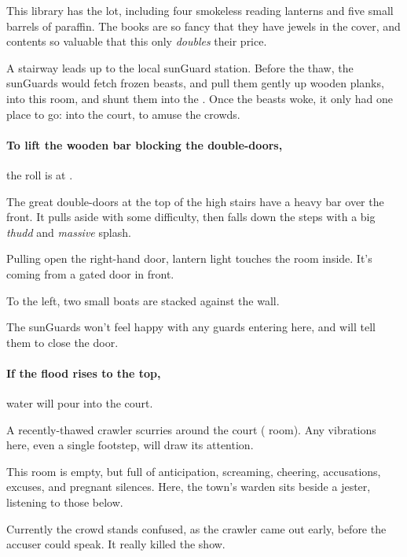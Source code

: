 \begin{multicols}{2}

This library has the lot, including four smokeless reading lanterns and five small barrels of paraffin.
The books are so fancy that they have jewels in the cover, and contents so valuable that this only \emph{doubles} their price.




\begin{exampletext}
  A stairway leads up to the local \gls{sunGuard} station.
  Before the thaw, the \glspl{sunGuard} would fetch frozen beasts, and pull them gently up wooden planks, into this room, and shunt them into the .
  Once the beasts woke, it only had one place to go: into the \gls{court}, to amuse the crowds.
\end{exampletext}

\paragraph{To lift the wooden bar blocking the double-doors,}
the roll is  at \tn[7].

\begin{boxtext}
  The great double-doors at the top of the high stairs have a heavy bar over the front.
  It pulls aside with some difficulty, then falls down the steps with a big \emph{thudd} and \emph{massive} splash.

  Pulling open the right-hand door, lantern light touches the room inside.
  It's coming from a gated door in front.

  To the left, two small boats are stacked against the wall.
\end{boxtext}

The \glspl{sunGuard} won't feel happy with any \glspl{guard} entering here, and will tell them to close the door.

\paragraph{If the flood rises to the top,}
water will pour into the \gls{court}.


A recently-thawed \gls{crawler} scurries around the \gls{court} ( room).
Any vibrations here, even a single footstep, will draw its attention.


\begin{exampletext}
  This room is empty, but full of anticipation, screaming, cheering, accusations, excuses, and pregnant silences.
  Here, the town's \gls{warden} sits beside a jester, listening to those below.
\end{exampletext}

Currently the crowd stands confused, as the \gls{crawler} came out early, before the accuser could speak.
It really killed the show.

\chitincrawler

\end{multicols}

